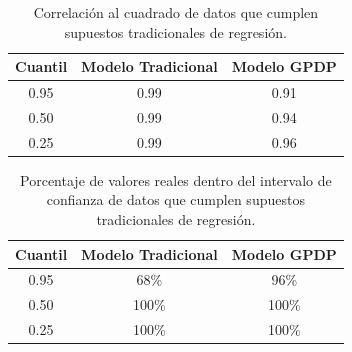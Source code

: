 \begin{table}[H]
\centering
\caption{Correlación al cuadrado de datos que cumplen supuestos tradicionales de regresi\'on.} 
\begin{tabular}{ccc}
  \hline
Cuantil & Modelo Tradicional & Modelo GPDP \\ 
  \hline
0.95 & 0.99 & 0.91 \\ 
  0.50 & 0.99 & 0.94 \\ 
  0.25 & 0.99 & 0.96 \\ 
   \hline
\end{tabular}
\label{corr_classic}
\end{table}

\begin{table}[H]
\centering
\caption{Porcentaje de valores reales dentro del intervalo de confianza de datos que cumplen supuestos tradicionales de regresi\'on.} 
\begin{tabular}{ccc}
  \hline
Cuantil & Modelo Tradicional & Modelo GPDP \\ 
  \hline
0.95 & 68\% & 96\% \\ 
  0.50 & 100\% & 100\% \\ 
  0.25 & 100\% & 100\% \\ 
   \hline
\end{tabular}
\label{within_classic}
\end{table}

